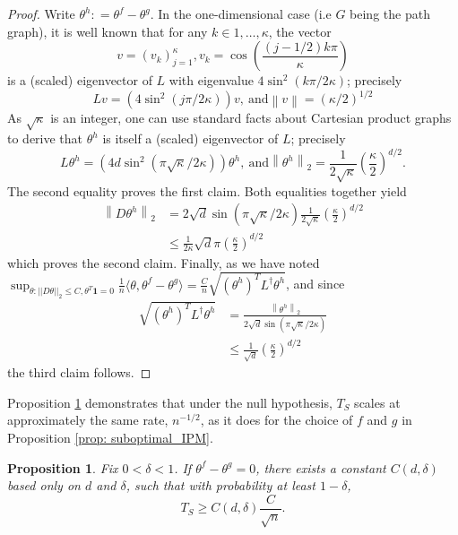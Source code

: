 \documentclass{article}
\newcommand{\norm}[1]{\left\lVert#1\right\rVert}
\newcommand{\dotp}[2]{\langle #1, #2 \rangle}
\newcommand{\1}{\mathbb{I}}
\newcommand{\Linv}{L^{\dagger}}
\theoremstyle{alden}
\theoremstyle{aldenthm}
\newtheorem{proposition}{Proposition}
\theoremstyle{definition}
\theoremstyle{remark}
\begin{document}
\begin{proof}
	Write $\theta^h : = \theta^f - \theta^g$. In the one-dimensional case (i.e $G$ being the path graph), it is well known that for any $k \in 1,\ldots, \kappa$, the vector 
	\begin{equation*}
	v = (v_k)_{j=1}^{\kappa}, v_k = \cos\left(\frac{(j - 1/2)k\pi}{\kappa}\right)
	\end{equation*}
	is a (scaled) eigenvector of $L$ with eigenvalue $4 \sin^2(k \pi/2\kappa)$; precisely
	\begin{equation*}
	L v = (4 \sin^2(j \pi/2 \kappa)) v,~ \text{and} \norm{v} = (\kappa/2)^{1/2}
	\end{equation*}
	As $\sqrt{\kappa}$ is an integer, one can use standard facts about Cartesian product graphs to derive that $\theta^h$ is itself a (scaled) eigenvector of $L$; precisely
	\begin{equation*}
	L \theta^h = (4d \sin^2(\pi \sqrt{\kappa}/2{\kappa})) \theta^h,~ \textrm{and} \norm{\theta^h}_2 = \frac{1}{2 \sqrt{\kappa}}\left(\frac{\kappa}{2}\right)^{d/2}.
	\end{equation*}
	The second equality proves the first claim. Both equalities together yield
	\begin{align*}
	\norm{D \theta^h}_2 & = 2 \sqrt{d} \sin(\pi \sqrt{\kappa}/2\kappa) \frac{1}{2 \sqrt{\kappa}} \left(\frac{\kappa}{2}\right)^{d/2} \\
	& \leq \frac{1}{2 \kappa}\sqrt{d} \pi \left(\frac{\kappa}{2}\right)^{d/2}
	\end{align*}
	which proves the second claim. Finally, as we have noted $\sup_{\theta: ||D\theta||_2 \leq C, \theta^T \mathbf{1} = 0} 
	\frac{1}{n}\dotp{\theta}{\theta^f - \theta^g} = \frac{C}{n} \sqrt{(\theta^h)^T \Linv \theta^h}$, and since
	\begin{align*}
	\sqrt{(\theta^h)^T \Linv \theta^h} & = \frac{\norm{\theta^h}_2}{2 \sqrt{d} \sin(\pi \sqrt{\kappa}/2{\kappa})} \\
	& \leq \frac{1}{\sqrt{d}}\left(\frac{\kappa}{2}\right)^{d/2}
	\end{align*}
	the third claim follows.
\end{proof}

Proposition \ref{prop: type_I_error} demonstrates that under the null hypothesis, $T_S$ scales at approximately the same rate, $n^{-1/2}$, as it does for the choice of $f$ and $g$ in Proposition \ref{prop: suboptimal_IPM}.
\begin{proposition}
	\label{prop: type_I_error}
	Fix $0 < \delta < 1$. If $\theta^f - \theta^g = 0$, there exists a constant $C(d,\delta)$ based only on $d$ and $\delta$, such that with probability at least $1 - \delta$,
	\begin{equation*}
	T_{S} \geq C(d,\delta) \frac{C}{\sqrt{n}}.
	\end{equation*}
\end{proposition}
\end{document}
